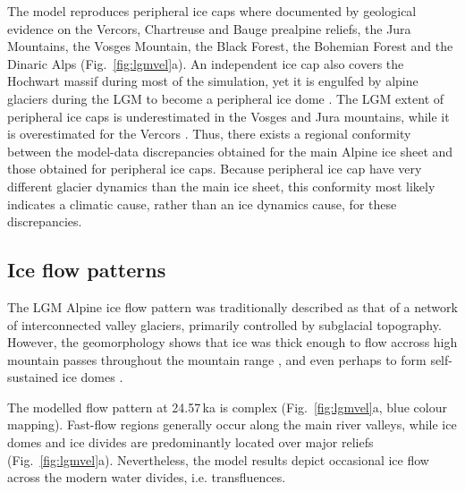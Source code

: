\documentclass[tc, manuscript]{copernicus}
\begin{document}
    The model reproduces peripheral ice caps where documented by geological
    evidence on the Vercors, Chartreuse and Bauge prealpine reliefs,
    the Jura Mountains, the Vosges Mountain, the Black Forest, the Bohemian
    Forest and the Dinaric Alps (Fig.~\ref{fig:lgmvel}a). An independent ice
    cap also covers the Hochwart massif during most of the simulation, yet it
    is engulfed by alpine glaciers during the LGM to become a peripheral ice
    dome \citep[Fig.~\ref{fig:lgmvel}a; cf.][Fig.~2.5]{Husen.2011}. The LGM
    extent of peripheral ice caps is underestimated in the Vosges and Jura
    mountains, while it is overestimated for the Vercors
    \citep[Fig.~\ref{fig:lgmvel}a; cf.][Figs.~4.28, 4.32, and 4.33,
    p.~322--321]{Coutterand.2010}. Thus, there exists a regional conformity
    between
    the model-data discrepancies obtained for the main Alpine ice sheet and
    those obtained for peripheral ice caps. Because peripheral ice cap have
    very different glacier dynamics than the main ice sheet, this conformity
    most likely indicates a climatic cause, rather than an ice dynamics cause,
    for these discrepancies.


\subsection{Ice flow patterns}
\label{sec:flow}

    The LGM Alpine ice flow pattern was traditionally described as that of a
    network of interconnected valley glaciers, primarily controlled by
    subglacial topography. However, the geomorphology shows that ice was thick
    enough to flow accross high mountain passes throughout the mountain range
    \citep[e.g.,][]{Onde.1938, Penck.Bruckner.1909, Jackli.1962, Husen.1985,
    Coutterand.2010, Kelly.etal.2004, Husen.2011}, and even perhaps to form
    self-sustained ice domes \citep{Florineth.1998, Florineth.Schluchter.1998,
    Kelly.etal.2004, Bini.etal.2009}.

    The modelled flow pattern at 24.57\,ka is complex (Fig.~\ref{fig:lgmvel}a,
    blue colour mapping). Fast-flow regions generally occur along the main
    river valleys, while ice domes and ice divides are predominantly located
    over major reliefs (Fig.~\ref{fig:lgmvel}a). Nevertheless, the model
    results depict occasional ice flow across the modern water divides, i.e.
    transfluences.
\end{document}
